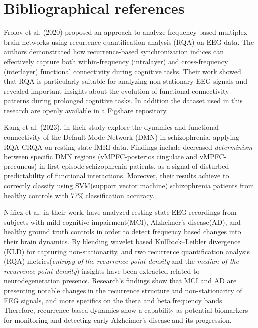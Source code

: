 \documentclass{article}
\begin{document}
	\section*{Bibliographical references}

			Frolov et al.\cite{frolov} (2020) proposed an approach to analyze frequency based multiplex brain networks
			using recurrence quantification analysis (RQA) 
			on EEG data. The authors demonstrated how recurrence-based 
			synchronization indices can effectively capture 
			both within-frequency (intralayer) and cross-frequency (interlayer) 
			functional connectivity during cognitive tasks. 
			Their work showed that RQA is particularly suitable for analyzing 
			non-stationary EEG signals and revealed
			important insights about the evolution of functional connectivity 
			patterns during prolonged cognitive tasks. In addition the dataset
			used in this research are openly available in a Figshare repository.

			Kang et al. (2023)\cite{kang}, in their study explore the dynamics and functional connectivity of the 
			Default Mode Network (DMN) in schizophrenia, applying RQA-CRQA on resting-state fMRI data. 
			Findings include decreased \textit{determinism} between specific DMN regions 
			(vMPFC-posterios cingulate and vMPFC-precuneus) in first-episode schizophrenia patients, 
			as a signal of disturbed predictability of functional interactions. 
			Moreover, their results achieve to correctly classify using SVM(support vector machine)
			schizophrenia patients from healthy controls with 77\% classification accuracy.

			Núñez et al. \cite{nunez2020characterization} in their work, have analyzed
			resting-state EEG recordings from subjects with mild cognitive impairment(MCI), 
			Alzheimer's disease(AD), and healthy ground truth controls in order to detect 
			frequency based changes into their brain dynamics. 
			By blending wavelet based Kullback–Leibler divergence
			(KLD) for capturing non-stationarity,
			and two recurrence quantification analysis (RQA)
			metrics(\textit{entropy of the recurrence point density}
			and the \textit{median of the recurrence point density}) insights have been
			extracted related to neurodegeneration presence.
			Research's findings show that MCI and AD are presenting notable changes in 
			the recurrence structure and non-stationarity of EEG signals,
			and more specifics on the theta and beta frequency bands.
			Therefore, recurrence based dynamics show a capability as potential 
			biomarkers for monitoring and detecting early Alzheimer's disease and its progression.
\end{document}
